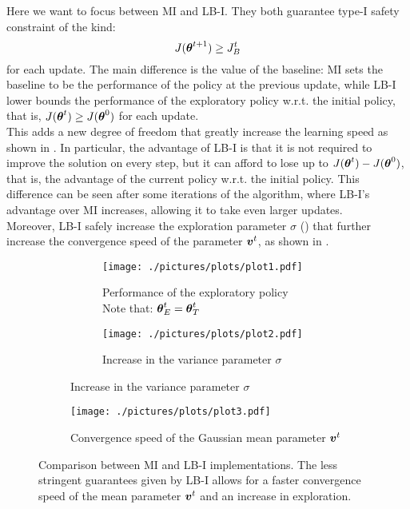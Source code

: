 Here we want to focus between MI and LB-I. They both guarantee type-I safety constraint of the kind:
\[
J({\boldsymbol{\theta}}^{t+1}) \geq {J_{B}^{t}}
\]
for each update. The main difference is the value of the baseline: MI sets the baseline to be the performance of the policy at the previous update, while LB-I lower bounds the performance of the exploratory policy w.r.t. the initial policy, that is, $J({\boldsymbol{\theta}}^t)\geq J({\boldsymbol{\theta}}^0)$ for each update.\\
This adds a new degree of freedom that greatly increase the learning speed as shown in . In particular, the advantage of LB-I is that it is not required to improve the solution on every step, but it can afford to lose up to $J({\boldsymbol{\theta}}^t) - J({\boldsymbol{\theta}}^0)$, that is, the advantage of the current policy w.r.t. the initial policy. This difference can be seen after some iterations of the algorithm, where LB-I's advantage over MI increases, allowing it to take even larger updates.\\
Moreover, LB-I safely increase the exploration parameter $\sigma$ () that further increase the convergence speed of the parameter $\boldsymbol{v}^t$, as shown in .

\begin{figure}[t]
\centering
\begin{subfigure}[t]{\textwidth}
\begin{subfigure}[t]{0.5\textwidth}
\texttt{[image: ./pictures/plots/plot1.pdf]}
\caption{Performance of the exploratory policy \\Note that: ${\boldsymbol{\theta}}^t_E = {\boldsymbol{\theta}}^t_T$} \label{fig:plot1-1}
\end{subfigure}
\hfill
\begin{subfigure}[t]{0.5\textwidth}
\texttt{[image: ./pictures/plots/plot2.pdf]}
\caption{Increase in the variance parameter $\sigma$} \label{fig:plot1-2}
\end{subfigure}
\end{subfigure}
\begin{subfigure}[t]{0.5\textwidth}
\texttt{[image: ./pictures/plots/plot3.pdf]}
\caption{Convergence speed of the Gaussian mean parameter $\boldsymbol{v}^t$} \label{fig:plot1-3}
\end{subfigure}
\caption[Comparison between MI and LB-I implementations.]{Comparison between MI and LB-I implementations. The less stringent guarantees given by LB-I allows for a faster convergence speed of the mean parameter $\boldsymbol{v}^t$ and an increase in exploration. }
\label{fig:plot1}
\end{figure}

